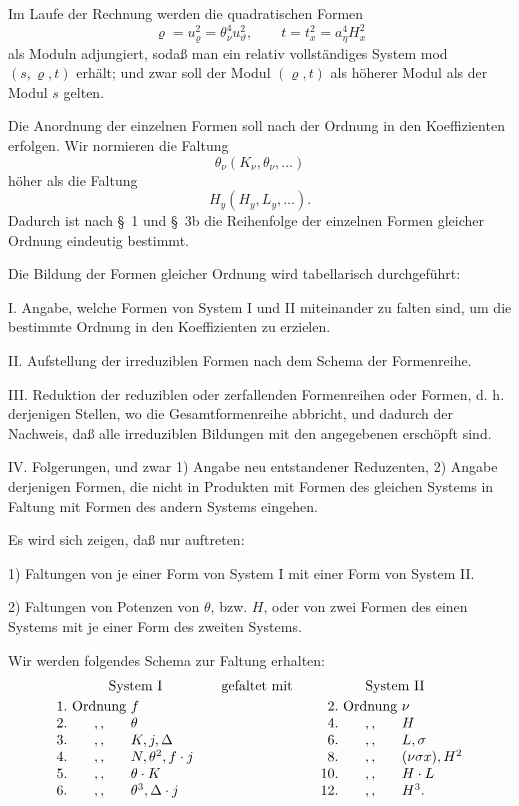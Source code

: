 \documentclass[11pt]{article}
\newcommand{\A}{\Delta}
\begin{document}
Im Laufe der Rechnung werden die quadratischen Formen
\[
\varrho=u_\varrho^2=\theta_\nu^4u_\vartheta^2,
\qquad
 t=t_x^2=a_\eta^4H_x^2
\]
als Moduln adjungiert, sodaß man ein relativ vollständiges System mod $(s,\varrho,t)$ erhält; und zwar soll der Modul $(\varrho,t)$ als höherer Modul als der Modul $s$ gelten.

Die Anordnung der einzelnen Formen soll nach der Ordnung in den Koeffizienten erfolgen. Wir normieren die Faltung
\[
\theta_\nu(K_\nu,\theta_\nu,\ldots)
\]
höher als die Faltung
\[
H_y(H_y,L_y,\ldots).
\]
Dadurch ist nach \S\ 1 und \S\ 3b die Reihenfolge der einzelnen Formen gleicher Ordnung eindeutig bestimmt.

Die Bildung der Formen gleicher Ordnung wird tabellarisch durchgeführt:

I. Angabe, welche Formen von System I und II miteinander zu falten sind, um die bestimmte Ordnung in den Koeffizienten zu erzielen.

II. Aufstellung der irreduziblen Formen nach dem Schema der Formenreihe.

III. Reduktion der reduziblen oder zerfallenden Formenreihen oder Formen, d. h. derjenigen Stellen, wo die Gesamtformenreihe abbricht, und dadurch der Nachweis, daß alle irreduziblen Bildungen mit den angegebenen erschöpft sind.

IV. Folgerungen, und zwar 1) Angabe neu entstandener Reduzenten, 2) Angabe derjenigen Formen, die nicht in Produkten mit Formen des gleichen Systems in Faltung mit Formen des andern Systems eingehen.

Es wird sich zeigen, daß nur auftreten:

1) Faltungen von je einer Form von System I mit einer Form von System II.

2) Faltungen von Potenzen von $\theta$, bzw. $H$, oder von zwei Formen des einen Systems mit je einer Form des zweiten Systems.

Wir werden folgendes Schema zur Faltung erhalten:
\[
\begin{array}{r@{\ }c@{\ }l@{\qquad}c@{\qquad}r@{\ }c@{\ }l}
\multicolumn{3}{c}{\text{System I}} & \text{gefaltet mit} & \multicolumn{3}{c}{\text{System II}}\\[0.25em]
1. & \text{Ordnung} & f & & 2. & \text{Ordnung} & \nu\\
2. & ,, & \theta & & 4. & ,, & H\\
3. & ,, & K,j,\A & & 6. & ,, & L,\sigma\\
4. & ,, & N,\theta^2,f\cdot j & & 8. & ,, & (\nu\sigma x),H^2\\
5. & ,, & \theta\cdot K & & 10. & ,, & H\cdot L\\
6. & ,, & \theta^3,\A\cdot j & & 12. & ,, & H^3.
\end{array}
\]
\end{document}
